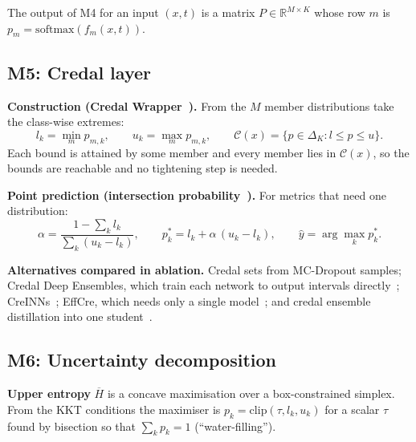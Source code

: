 \documentclass[11pt,a4paper]{article}
\newcommand{\up}[1]{\overline{#1}}
\newcommand{\credal}{\mathcal{C}}
\newcommand{\simplex}{\Delta_K}
\begin{document}
The output of M4 for an input $(x,t)$ is a matrix $P \in \mathbb{R}^{M \times K}$ whose row
$m$ is $p_m = \mathrm{softmax}(f_m(x,t))$.

\subsection{M5: Credal layer}\label{sec:m5}

\textbf{Construction (Credal Wrapper~\cite{wang2025wrapper}).} From the $M$ member
distributions take the class-wise extremes:
\begin{equation}
  l_k = \min_{m} p_{m,k}, \qquad u_k = \max_{m} p_{m,k}, \qquad
  \credal(x) = \{p \in \simplex : l \le p \le u\}.
  \label{eq:bounds}
\end{equation}
Each bound is attained by some member and every member lies in $\credal(x)$, so the bounds
are reachable and no tightening step is needed.

\textbf{Point prediction (intersection probability~\cite{wang2025wrapper}).} For metrics
that need one distribution:
\begin{equation}
  \alpha = \frac{1 - \sum_k l_k}{\sum_k (u_k - l_k)}, \qquad
  p^{*}_k = l_k + \alpha\,(u_k - l_k), \qquad \hat y = \arg\max_k p^{*}_k.
  \label{eq:ip}
\end{equation}

\textbf{Alternatives compared in ablation.} Credal sets from MC-Dropout samples; Credal Deep
Ensembles, which train each network to output intervals directly~\cite{wang2024crede};
CreINNs~\cite{wang2025creinn}; EffCre, which needs only a single model~\cite{hofman2026};
and credal ensemble distillation into one student~\cite{credaldistill2025}.

\subsection{M6: Uncertainty decomposition}\label{sec:m6}

\textbf{Upper entropy} $\up{H}$ is a concave maximisation over a box-constrained simplex.
From the KKT conditions the maximiser is $p_k = \mathrm{clip}(\tau, l_k, u_k)$ for a scalar
$\tau$ found by bisection so that $\sum_k p_k = 1$ (``water-filling'').
\end{document}
